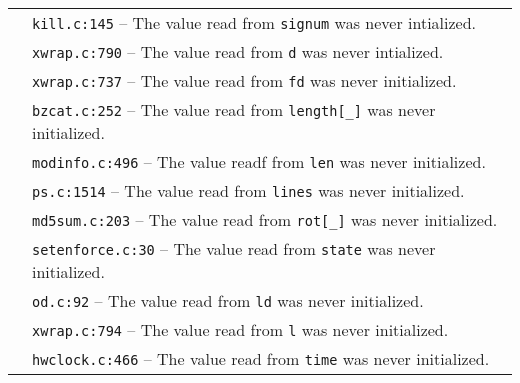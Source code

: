 \begin{tabularx}{\textwidth}{rY}
  & \texttt{kill.c:145} -- The value read from \texttt{signum} was never intialized. \\
  & \texttt{xwrap.c:790} -- The value read from \texttt{d} was never intialized. \\
  & \texttt{xwrap.c:737} -- The value read from \texttt{fd} was never initialized. \\
  & \texttt{bzcat.c:252} -- The value read from \texttt{length[\_]} was never initialized. \\
  & \texttt{modinfo.c:496} -- The value readf from \texttt{len} was never initialized.\\
  & \texttt{ps.c:1514} -- The value read from \texttt{lines} was never initialized.\\
  & \texttt{md5sum.c:203} -- The value read from \texttt{rot[\_]} was never initialized.\\
  & \texttt{setenforce.c:30} -- The value read from \texttt{state} was never initialized. \\
  & \texttt{od.c:92} -- The value read from \texttt{ld} was never initialized. \\
  & \texttt{xwrap.c:794} -- The value read from \texttt{l} was never initialized. \\
  & \texttt{hwclock.c:466} -- The value read from \texttt{time} was never initialized. \\
  \bottomrule
\end{tabularx}

